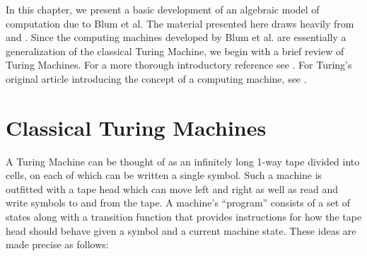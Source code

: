In this chapter, we present a basic development of an algebraic model
of computation due to Blum et al.  The material presented here draws
heavily from \cite{B89} and \cite{B98}.  Since the computing machines
developed by Blum et al. are essentially a generalization of the
classical Turing Machine, we begin with a brief review of Turing
Machines.  For a more thorough introductory reference see \cite{S06}.
For Turing's original article introducing the concept of a computing
machine, see \cite{T36}.

\section{Classical Turing Machines}

A Turing Machine can be thought of as an infinitely long 1-way tape
divided into cells, on each of which can be written a single symbol.
Such a machine is outfitted with a tape head which can move left and
right as well as read and write symbols to and from the tape. A
machine's ``program'' consists of a set of states along with a
transition function that provides instructions for how the tape head
should behave given a symbol and a current machine state.  These ideas
are made precise as follows:

